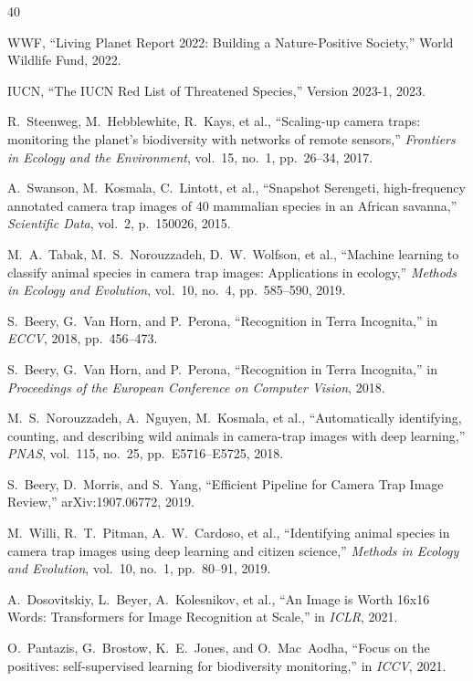 \documentclass[11pt,letterpaper]{article}
\begin{document}
\begin{thebibliography}{40}

WWF, ``Living Planet Report 2022: Building a Nature-Positive Society,'' World Wildlife Fund, 2022.

IUCN, ``The IUCN Red List of Threatened Species,'' Version 2023-1, 2023.

R.~Steenweg, M.~Hebblewhite, R.~Kays, et al., ``Scaling-up camera traps: monitoring the planet's biodiversity with networks of remote sensors,'' \emph{Frontiers in Ecology and the Environment}, vol.~15, no.~1, pp.~26--34, 2017.

A.~Swanson, M.~Kosmala, C.~Lintott, et al., ``Snapshot Serengeti, high-frequency annotated camera trap images of 40 mammalian species in an African savanna,'' \emph{Scientific Data}, vol.~2, p.~150026, 2015.

M.~A.~Tabak, M.~S.~Norouzzadeh, D.~W.~Wolfson, et al., ``Machine learning to classify animal species in camera trap images: Applications in ecology,'' \emph{Methods in Ecology and Evolution}, vol.~10, no.~4, pp.~585--590, 2019.

S.~Beery, G.~Van Horn, and P.~Perona, ``Recognition in Terra Incognita,'' in \emph{ECCV}, 2018, pp.~456--473.

S.~Beery, G.~Van Horn, and P.~Perona, ``Recognition in Terra Incognita,'' in \emph{Proceedings of the European Conference on Computer Vision}, 2018.

M.~S.~Norouzzadeh, A.~Nguyen, M.~Kosmala, et al., ``Automatically identifying, counting, and describing wild animals in camera-trap images with deep learning,'' \emph{PNAS}, vol.~115, no.~25, pp.~E5716--E5725, 2018.

S.~Beery, D.~Morris, and S.~Yang, ``Efficient Pipeline for Camera Trap Image Review,'' arXiv:1907.06772, 2019.

M.~Willi, R.~T.~Pitman, A.~W.~Cardoso, et al., ``Identifying animal species in camera trap images using deep learning and citizen science,'' \emph{Methods in Ecology and Evolution}, vol.~10, no.~1, pp.~80--91, 2019.

A.~Dosovitskiy, L.~Beyer, A.~Kolesnikov, et al., ``An Image is Worth 16x16 Words: Transformers for Image Recognition at Scale,'' in \emph{ICLR}, 2021.

O.~Pantazis, G.~Brostow, K.~E.~Jones, and O.~Mac~Aodha, ``Focus on the positives: self-supervised learning for biodiversity monitoring,'' in \emph{ICCV}, 2021.


\end{thebibliography}
\end{document}
